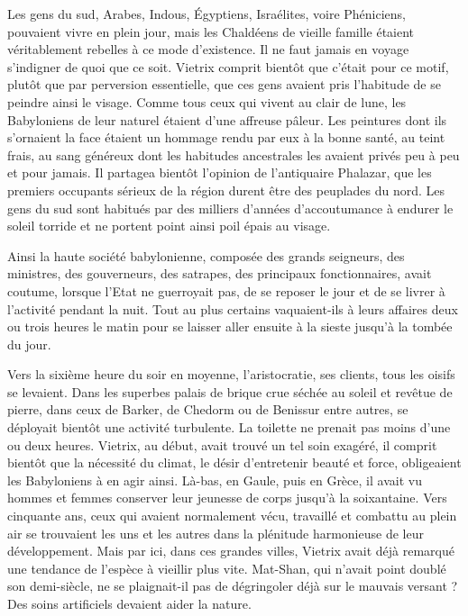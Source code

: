 \documentclass[a4paper, 11pt, oneside, polutonikogreek, french]{article}
\begin{document}
Les gens du sud, Arabes, Indous, Égyptiens, Israélites, voire Phéniciens, pouvaient vivre en plein jour, mais les Chaldéens de vieille famille étaient véritablement rebelles à ce mode d'existence. Il ne faut jamais en voyage s'indigner de quoi que ce soit. Vietrix comprit bientôt que c'était pour ce motif, plutôt que par perversion essentielle, que ces gens avaient pris l'habitude de se peindre ainsi le visage. Comme tous ceux qui vivent au clair de lune, les Babyloniens de leur naturel étaient d'une affreuse pâleur. Les peintures dont ils s'ornaient la face étaient un hommage rendu par eux à la bonne santé, au teint frais, au sang généreux dont les habitudes ancestrales les avaient privés peu à peu et pour jamais. Il partagea bientôt l'opinion de l'antiquaire Phalazar, que les premiers occupants sérieux de la région durent être des peuplades du nord. Les gens du sud sont habitués par des milliers d'années d'accoutumance à endurer le soleil torride et ne portent point ainsi poil épais au visage.

Ainsi la haute société babylonienne, composée des grands seigneurs, des ministres, des gouverneurs, des satrapes, des principaux fonctionnaires, avait coutume, lorsque l'Etat ne guerroyait pas, de se reposer le jour et de se livrer à l'activité pendant la nuit. Tout au plus certains vaquaient-ils à leurs affaires deux ou trois heures le matin pour se laisser aller ensuite à la sieste jusqu'à la tombée du jour.

\bigskip
\centerline{\EightStarTaper}
\centerline{\EightStarTaper\EightStarTaper}
\bigskip

Vers la sixième heure du soir en moyenne, l'aristocratie, ses clients, tous les oisifs se levaient. Dans les superbes palais de brique crue séchée au soleil et revêtue de pierre, dans ceux de Barker, de Chedorm ou de Benissur entre autres, se déployait bientôt une activité turbulente. La toilette ne prenait pas moins d'une ou deux heures. Vietrix, au début, avait trouvé un tel soin exagéré, il comprit bientôt que la nécessité du climat, le désir d'entretenir beauté et force, obligeaient les Babyloniens à en agir ainsi. Là-bas, en Gaule, puis en Grèce, il avait vu hommes et femmes conserver leur jeunesse de corps jusqu'à la soixantaine. Vers cinquante ans, ceux qui avaient normalement vécu, travaillé et combattu au plein air se trouvaient les uns et les autres dans la plénitude harmonieuse de leur développement. Mais par ici, dans ces grandes villes, Vietrix avait déjà remarqué une tendance de l'espèce à vieillir plus vite. Mat-Shan, qui n'avait point doublé son demi-siècle, ne se plaignait-il pas de dégringoler déjà sur le mauvais versant ? Des soins artificiels devaient aider la nature.
\end{document}
